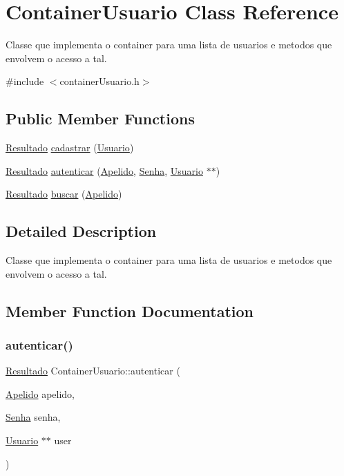 \hypertarget{classContainerUsuario}{}\section{Container\+Usuario Class Reference}
\label{classContainerUsuario}


Classe que implementa o container para uma lista de usuarios e metodos que envolvem o acesso a tal.  




{\ttfamily \#include $<$container\+Usuario.\+h$>$}

\subsection*{Public Member Functions}
\begin{DoxyCompactItemize}
\item 
\hyperlink{classResultado}{Resultado} \hyperlink{classContainerUsuario_a650844004136d741ede5c5a38d3dae3b}{cadastrar} (\hyperlink{classUsuario}{Usuario})
\item 
\hyperlink{classResultado}{Resultado} \hyperlink{classContainerUsuario_a671ee12e0e712bd4442750847f051aee}{autenticar} (\hyperlink{classApelido}{Apelido}, \hyperlink{classSenha}{Senha}, \hyperlink{classUsuario}{Usuario} $\ast$$\ast$)
\item 
\hyperlink{classResultado}{Resultado} \hyperlink{classContainerUsuario_ae25b805fee893e20b85a501e1ba4d252}{buscar} (\hyperlink{classApelido}{Apelido})
\end{DoxyCompactItemize}


\subsection{Detailed Description}
Classe que implementa o container para uma lista de usuarios e metodos que envolvem o acesso a tal. 

\subsection{Member Function Documentation}
\mbox{\label{classContainerUsuario_a671ee12e0e712bd4442750847f051aee}} 
\subsubsection{\texorpdfstring{autenticar()}{autenticar()}}
{\footnotesize\ttfamily \hyperlink{classResultado}{Resultado} Container\+Usuario\+::autenticar (\begin{DoxyParamCaption}\item[{\hyperlink{classApelido}{Apelido}}]{apelido,  }\item[{\hyperlink{classSenha}{Senha}}]{senha,  }\item[{\hyperlink{classUsuario}{Usuario} $\ast$$\ast$}]{user }\end{DoxyParamCaption})}

